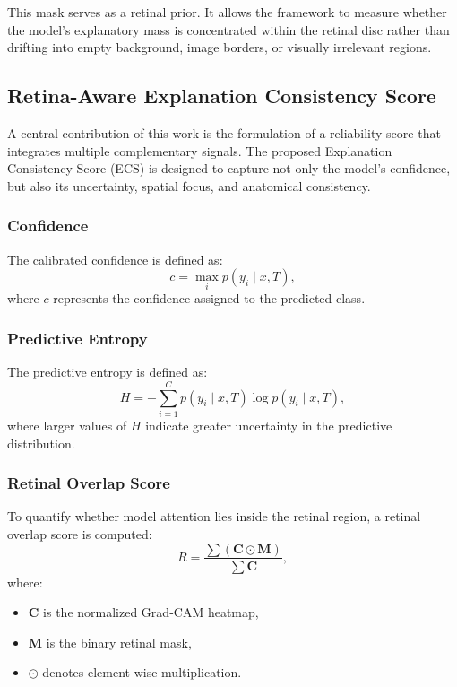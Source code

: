 \documentclass[conference]{IEEEtran}
\begin{document}
This mask serves as a retinal prior. It allows the framework to measure whether the model’s explanatory mass is concentrated within the retinal disc rather than drifting into empty background, image borders, or visually irrelevant regions.

\subsection{Retina-Aware Explanation Consistency Score}
A central contribution of this work is the formulation of a reliability score that integrates multiple complementary signals. The proposed Explanation Consistency Score (ECS) is designed to capture not only the model’s confidence, but also its uncertainty, spatial focus, and anatomical consistency.

\subsubsection{Confidence}
The calibrated confidence is defined as:
\begin{equation}
c = \max_i p(y_i \mid x, T),
\end{equation}
where $c$ represents the confidence assigned to the predicted class.

\subsubsection{Predictive Entropy}
The predictive entropy is defined as:
\begin{equation}
H = -\sum_{i=1}^{C} p(y_i \mid x, T)\log p(y_i \mid x, T),
\end{equation}
where larger values of $H$ indicate greater uncertainty in the predictive distribution.

\subsubsection{Retinal Overlap Score}
To quantify whether model attention lies inside the retinal region, a retinal overlap score is computed:
\begin{equation}
R = \frac{\sum (\mathbf{C} \odot \mathbf{M})}{\sum \mathbf{C}},
\end{equation}
where:
\begin{itemize}
    \item $\mathbf{C}$ is the normalized Grad-CAM heatmap,
    \item $\mathbf{M}$ is the binary retinal mask,
    \item $\odot$ denotes element-wise multiplication.
\end{itemize}
\end{document}
